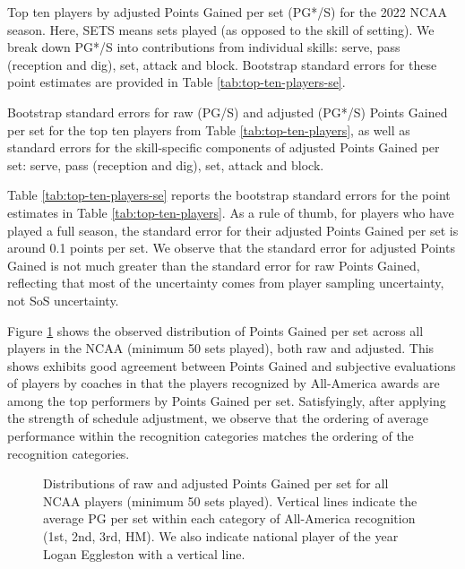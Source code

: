 \documentclass[USenglish]{article}
\theoremstyle{dgthm}
\theoremstyle{dgdef}
\begin{document}
\begin{table}
    \centering
    
    \caption{Top ten players by adjusted Points Gained per set (PG*/S) for the 2022 NCAA season. Here, SETS means sets played (as opposed to the skill of setting). We break down PG*/S into contributions from individual skills: serve, pass (reception and dig), set, attack and block. Bootstrap standard errors for these point estimates are provided in Table \ref{tab:top-ten-players-se}.}
    \label{tab:top-ten-players}
\end{table}

\begin{table}
    \centering
    
    \caption{Bootstrap standard errors for raw (PG/S) and adjusted (PG*/S) Points Gained per set for the top ten players from Table \ref{tab:top-ten-players}, as well as standard errors for the skill-specific components of adjusted Points Gained per set: serve, pass (reception and dig), set, attack and block.}
    \label{tab:top-ten-players-se}
\end{table}

Table \ref{tab:top-ten-players-se} reports the bootstrap standard errors for the point estimates in Table \ref{tab:top-ten-players}. As a rule of thumb, for players who have played a full season, the standard error for their adjusted Points Gained per set is around 0.1 points per set. We observe that the standard error for adjusted Points Gained is not much greater than the standard error for raw Points Gained, reflecting that most of the uncertainty comes from player sampling uncertainty, not SoS uncertainty.

Figure \ref{fig:avca-all-americans} shows the observed distribution of Points Gained per set across all players in the NCAA (minimum 50 sets played), both raw and adjusted. This shows exhibits good agreement between Points Gained and subjective evaluations of players by coaches in that the players recognized by All-America awards are among the top performers by Points Gained per set. Satisfyingly, after applying the strength of schedule adjustment, we observe that the ordering of average performance within the recognition categories matches the ordering of the recognition categories.

\begin{figure}
    \centering
    \caption{Distributions of raw and adjusted Points Gained per set for all NCAA players (minimum 50 sets played). Vertical lines indicate the average PG per set within each category of All-America recognition (1st, 2nd, 3rd, HM). We also indicate national player of the year Logan Eggleston with a vertical line.}
    \label{fig:avca-all-americans}
\end{figure}
\end{document}
